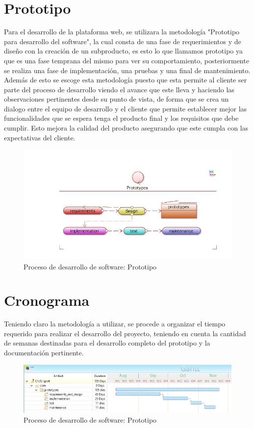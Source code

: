 \section{Prototipo}
Para el desarrollo de la plataforma web, se utilizara la metodología "Prototipo para desarrollo del software", la cual consta de una fase de requerimientos y de diseño con la creación de un subproducto, es esto lo que llamamos prototipo ya que es una fase temprana del mismo para ver su comportamiento, posteriormente se realiza una fase de implementación, una pruebas y una final de mantenimiento.
\newline
Además de esto se escoge esta metodología puesto que esta permite al cliente ser parte del proceso de desarrollo viendo el avance que este lleva y haciendo las observaciones pertinentes desde su punto de vista, de forma que se crea un dialogo entre el equipo de desarrollo y el cliente que permite establecer mejor las funcionalidades que se espera tenga el producto final y los requisitos que debe cumplir. Esto mejora la calidad del producto asegurando que este cumpla con las expectativas del cliente.
\begin{figure}[th!]
	\centering
	\includegraphics[width=0.9\linewidth]{imagenes/Proceso1}
	\caption{Proceso de desarrollo de software: Prototipo}
\end{figure}


\section{Cronograma}

Teniendo claro la metodología a utilizar, se procede a organizar el tiempo requerido para realizar el desarrollo del proyecto, teniendo en cuenta la cantidad de semanas destinadas para el desarrollo completo del prototipo y la documentación pertinente.

\begin{figure}[th!]
	\centering
	\includegraphics[width=0.9\linewidth]{imagenes/cronograma}
	\caption{Proceso de desarrollo de software: Prototipo}
\end{figure}


\newpage